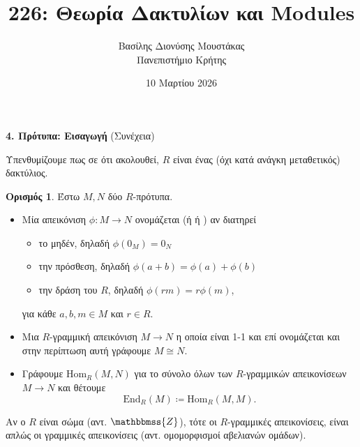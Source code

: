 \documentclass[12pt,a4paper,reqno]{amsart}
\title{226: Θεωρία Δακτυλίων και Modules}
\author[Β.~Δ. Μουστακας]{Βασίλης Διονύσης Μουστάκας \\ Πανεπιστήμιο Κρήτης}
\date{10 Μαρτίου 2026}
\theoremstyle{definition}
\newtheorem{definition}[theorem]{Ορισμός}
\theoremstyle{remark}
\numberwithin{theorem}{section}
\numberwithin{exercise}{section}
\numberwithin{equation}{section}
\newcommand{\ZZ}{\mathbbmss{Z}}
\renewcommand{\to}{\rightarrow}
\newcommand{\End}{\mathrm{End}}
\newcommand{\Hom}{\mathrm{Hom}}
\newcommand{\defn}[1]{{\color{mylightblue}{#1}}}
\begin{document}
\begingroup
\def\uppercasenonmath#1{} %
\let\MakeUppercase\relax %
\maketitle
\endgroup

\setcounter{section}{4}
\setcounter{theorem}{5}
\begin{center}
    \textbf{4. Πρότυπα: Εισαγωγή
} (Συνέχεια)
\end{center}

Υπενθυμίζουμε πως σε ότι ακολουθεί, $R$ είναι ένας (όχι κατά ανάγκη μεταθετικός) δακτύλιος.

\begin{definition}
    \label{def:module_homomorphism}
    Έστω $M, N$ δύο $R$-πρότυπα. 
    \begin{itemize}
        \item Μία απεικόνιση $\phi : M \to N$ ονομάζεται \defn{ομομορφισμός $R$-προτύπων} (ή \defn{$R$-ομομορφι\-σμός} ή \defn{$R$-γραμμική}) αν διατηρεί 
        \begin{itemize}
            \item το μηδέν, δηλαδή $\phi(0_M) = 0_N$
            \item την πρόσθεση, δηλαδή $\phi(a + b) = \phi(a) + \phi(b)$
            \item την δράση του $R$, δηλαδή $\phi(rm) = r\phi(m)$,
        \end{itemize}
        για κάθε $a, b, m \in M$ και $r \in R$.
        \item Μια $R$-γραμμική απεικόνιση $M \to N$ η οποία είναι 1-1 και επί ονομάζεται \defn{$R$-ισομο\-ρφισμός} και στην περίπτωση αυτή γράφουμε $M \cong N$.
        \item Γράφουμε $\Hom_R(M,N)$ για το σύνολο όλων των $R$-γραμμικών απεικονίσεων $M \to N$ και θέτουμε 
        \[
        \End_R(M) \coloneqq \Hom_R(M,M).
        \]
    \end{itemize}
\end{definition}

Αν ο $R$ είναι σώμα (αντ. $\ZZ$), τότε οι $R$-γραμμικές απεικονίσεις, είναι απλώς οι γραμμικές απεικονίσεις (αντ. ομομορφισμοί αβελιανών ομάδων). 
\end{document}
